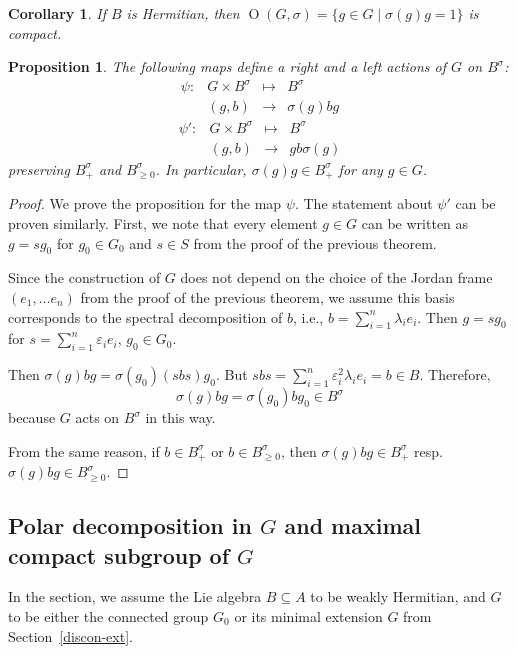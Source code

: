 \documentclass[a4paper,oneside,11pt]{amsart}
\DeclareMathOperator{\OO}{O}
\theoremstyle{plain}
\newtheorem{cor}[teo]{Corollary}
\newtheorem{prop}[teo]{Proposition}
\theoremstyle{definition}
\theoremstyle{remark}
\begin{document}
\begin{cor}
If $B$ is Hermitian, then $\OO(G,\sigma)=\{g\in G\mid \sigma(g)g=1\}$ is compact.
\end{cor}


\begin{prop}
The following maps define a right and a left actions of $G$ on $B^\sigma$:
$$\begin{matrix}
\psi\colon & G\times B^{\sigma} & \mapsto & B^{\sigma}\\
& (g,b) & \to & \sigma(g)bg
\end{matrix}$$
$$\begin{matrix}
\psi'\colon & G\times B^{\sigma} & \mapsto & B^{\sigma}\\
& (g,b) & \to & gb\sigma(g)
\end{matrix}$$
preserving $B^{\sigma}_+$ and $B^{\sigma}_{\geq 0}$. In particular, $\sigma(g)g\in B^{\sigma}_+$ for any $g\in G$.
\end{prop}

\begin{proof} We prove the proposition for the map $\psi$. The statement about $\psi'$ can be proven similarly. First, we note that every element $g\in G$ can be written as $g=sg_0$ for $g_0\in G_0$ and $s\in S$ from the proof of the previous theorem.

Since the construction of $G$ does not depend on the choice of the Jordan frame $(e_1,\dots e_n)$ from the proof of the previous theorem, we assume this basis corresponds to the spectral decomposition of $b$, i.e., $b=\sum_{i=1}^n\lambda_ie_i$. Then $g=sg_0$ for $s=\sum_{i=1}^n\varepsilon_ie_i$, $g_0\in G_0$.

Then $\sigma(g)bg=\sigma(g_0)(sbs)g_0$. But $sbs=\sum_{i=1}^n\varepsilon_i^2\lambda_ie_i=b\in B$. Therefore, 
$$\sigma(g)bg=\sigma(g_0)bg_0\in B^{\sigma}$$
because $G$ acts on $B^{\sigma}$ in this way.

From the same reason, if $b\in B^{\sigma}_+$ or $b\in B^{\sigma}_{\geq 0}$, then $\sigma(g)bg\in B^{\sigma}_+$ resp. $\sigma(g)bg\in B^{\sigma}_{\geq 0}$.
\end{proof}


\subsection{Polar decomposition in \texorpdfstring{$G$}{G} and maximal compact subgroup of \texorpdfstring{$G$}{G}}
In the section, we assume the Lie algebra $B\subseteq A$ to be weakly Hermitian, and $G$ to be either the connected group $G_0$ or its minimal extension $G$ from Section~\ref{discon-ext}. 
\end{document}
